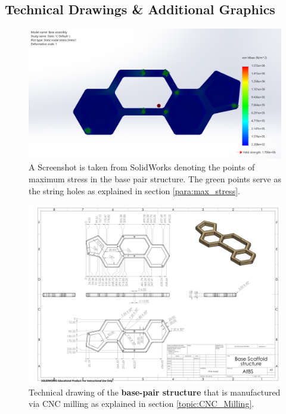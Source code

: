 \documentclass[12pt]{extarticle} %
\begin{document}
\subsection{Technical Drawings \& Additional Graphics}\label{topic:technical_drawings}

\begin{figure}[!ht]
    \centering
    \includegraphics[width=1\textwidth]{images/screenshots/stress_test.png}
    \caption{A Screenshot is taken from SolidWorks denoting the points of maximum stress in the base pair structure. The green points serve as the string holes as explained in section \ref{para:max_stress}.}
    \label{screenshot:stress_test_image}
\end{figure}

\begin{figure}
    \centering
    \includegraphics[width=1\textwidth ]{images/technical_drawings/Base structure-1.png}
    \caption{Technical drawing of the \textbf{base-pair structure} that is manufactured via CNC milling as explained in section \ref{topic:CNC_Milling}.}
    \label{technical_drawing:base_pair}
\end{figure}
\end{document}
